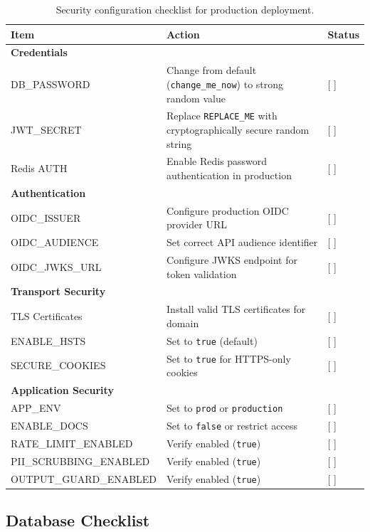 \begin{table}[ht]
\centering
\caption{Security configuration checklist for production deployment.}
\label{tab:security-checklist}
\small
\begin{tabularx}{\textwidth}{lXl}
\hline
\textbf{Item} & \textbf{Action} & \textbf{Status} \\
\hline
\multicolumn{3}{l}{\textbf{Credentials}} \\
DB\_PASSWORD & Change from default (\texttt{change\_me\_now}) to strong random value & [ ] \\
JWT\_SECRET & Replace \texttt{REPLACE\_ME} with cryptographically secure random string & [ ] \\
Redis AUTH & Enable Redis password authentication in production & [ ] \\
\hline
\multicolumn{3}{l}{\textbf{Authentication}} \\
OIDC\_ISSUER & Configure production OIDC provider URL & [ ] \\
OIDC\_AUDIENCE & Set correct API audience identifier & [ ] \\
OIDC\_JWKS\_URL & Configure JWKS endpoint for token validation & [ ] \\
\hline
\multicolumn{3}{l}{\textbf{Transport Security}} \\
TLS Certificates & Install valid TLS certificates for domain & [ ] \\
ENABLE\_HSTS & Set to \texttt{true} (default) & [ ] \\
SECURE\_COOKIES & Set to \texttt{true} for HTTPS-only cookies & [ ] \\
\hline
\multicolumn{3}{l}{\textbf{Application Security}} \\
APP\_ENV & Set to \texttt{prod} or \texttt{production} & [ ] \\
ENABLE\_DOCS & Set to \texttt{false} or restrict access & [ ] \\
RATE\_LIMIT\_ENABLED & Verify enabled (\texttt{true}) & [ ] \\
PII\_SCRUBBING\_ENABLED & Verify enabled (\texttt{true}) & [ ] \\
OUTPUT\_GUARD\_ENABLED & Verify enabled (\texttt{true}) & [ ] \\
\hline
\end{tabularx}
\end{table}

\subsection{Database Checklist}

